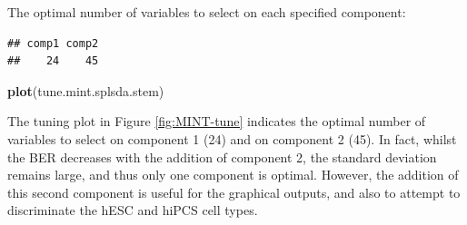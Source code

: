 \documentclass[]{book}
\newenvironment{Shaded}{\begin{snugshade}}{\end{snugshade}}
\newcommand{\KeywordTok}[1]{\textcolor[rgb]{0.13,0.29,0.53}{\textbf{#1}}}
\newcommand{\DataTypeTok}[1]{\textcolor[rgb]{0.13,0.29,0.53}{#1}}
\newcommand{\DecValTok}[1]{\textcolor[rgb]{0.00,0.00,0.81}{#1}}
\newcommand{\StringTok}[1]{\textcolor[rgb]{0.31,0.60,0.02}{#1}}
\newcommand{\CommentTok}[1]{\textcolor[rgb]{0.56,0.35,0.01}{\textit{#1}}}
\newcommand{\OperatorTok}[1]{\textcolor[rgb]{0.81,0.36,0.00}{\textbf{#1}}}
\newcommand{\NormalTok}[1]{#1}
\begin{document}
\begin{Shaded}
\end{Shaded}

The optimal number of variables to select on each specified component:

\begin{Shaded}
\end{Shaded}

\begin{verbatim}
## comp1 comp2 
##    24    45
\end{verbatim}

\begin{Shaded}
\begin{Highlighting}[]
\KeywordTok{plot}\NormalTok{(tune.mint.splsda.stem)}
\end{Highlighting}
\end{Shaded}









The tuning plot in Figure \ref{fig:MINT-tune} indicates the optimal
number of variables to select on component 1 (24) and on component 2
(45). In fact, whilst the BER decreases with the addition of component
2, the standard deviation remains large, and thus only one component is
optimal. However, the addition of this second component is useful for
the graphical outputs, and also to attempt to discriminate the hESC and
hiPCS cell types.
\end{document}
